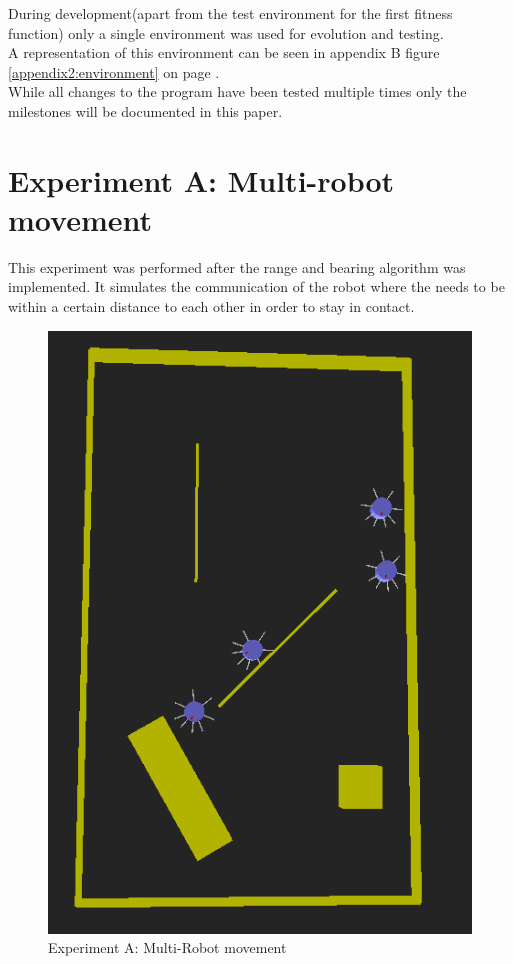 During development(apart from the test environment for the first fitness function) only a single environment was used for evolution and testing.\\
A representation of this environment can be seen in appendix B figure \ref{appendix2:environment} on page \pageref{appendix2:environment}.\\
While all changes to the program have been tested multiple times only the milestones will be documented in this paper. \\

\section{Experiment A: Multi-robot movement}
This experiment was performed after the range and bearing algorithm was implemented. It simulates the communication of the robot where the needs to be within a certain distance to each other in order to stay in contact.\\

\begin{figure}[h]
\centering
\includegraphics[scale=0.5]{Chapter4/images/experiment_A.png}
\caption{Experiment A: Multi-Robot movement}
\label{fig:experiment_a}
\end{figure}

